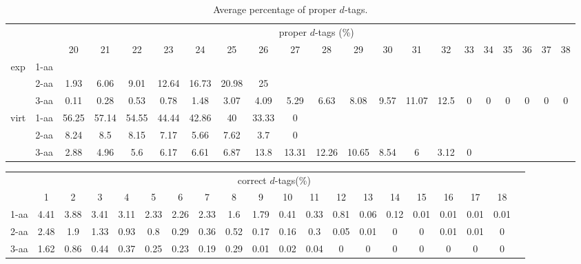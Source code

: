 \begin{table}[h]\tiny
\vspace{3mm}
{\centering
\begin{center}
\begin{tabular}{|c|l|c|c|c|c|c|c|c|c|c|c|c|c|c|c|c|c|c|c|c|}
  \hline
  \multicolumn{2}{|c|}{ } & \multicolumn{ 19 }{|c|}{ proper $d$-tags (\%)} \\
  \cline{3- 21}
  \multicolumn{2}{|c|}{ }  & 20 & 21 & 22 & 23 & 24 & 25 & 26 & 27 & 28 & 29 & 30 & 31 & 32 & 33 & 34 & 35 & 36 & 37 & 38\\
  \hline
  \multirow{3}{*}{exp}
&  1-aa  &  &  &  &  &  &  &  &  &  &  &  &  &  &  &  &  &  &  & \\
&  2-aa  & 1.93 & 6.06 & 9.01 & 12.64 & 16.73 & 20.98 & 25 &  &  &  &  &  &  &  &  &  &  &  & \\
&  3-aa  & 0.11 & 0.28 & 0.53 & 0.78 & 1.48 & 3.07 & 4.09 & 5.29 & 6.63 & 8.08 & 9.57 & 11.07 & 12.5 & 0 & 0 & 0 & 0 & 0 & 0\\
 \hline
  \multirow{3}{*}{virt} 
&  1-aa  & 56.25 & 57.14 & 54.55 & 44.44 & 42.86 & 40 & 33.33 & 0 &  &  &  &  &  &  &  &  &  &  & \\
&  2-aa  & 8.24 & 8.5 & 8.15 & 7.17 & 5.66 & 7.62 & 3.7 & 0 &  &  &  &  &  &  &  &  &  &  & \\
&  3-aa  & 2.88 & 4.96 & 5.6 & 6.17 & 6.61 & 6.87 & 13.8 & 13.31 & 12.26 & 10.65 & 8.54 & 6 & 3.12 & 0 &  &  &  &  & \\
 \hline
\end{tabular}
\end{center}
\par}
\centering

\caption{ Average percentage of proper $d$-tags.}

\vspace{3mm}
\label{table:proper-d-tags}
\end{table}
\begin{table}[h]\tiny
\vspace{3mm}
{\centering
\begin{center}
\begin{tabular}{|l|c|c|c|c|c|c|c|c|c|c|c|c|c|c|c|c|c|c|c|}
  \hline
  & \multicolumn{ 18 }{|c|}{correct $d$-tags(\%)} \\
  \cline{2- 19}
    & 1 & 2 & 3 & 4 & 5 & 6 & 7 & 8 & 9 & 10 & 11 & 12 & 13 & 14 & 15 & 16 & 17 & 18\\
  \hline
1-aa  & 4.41 & 3.88 & 3.41 & 3.11 & 2.33 & 2.26 & 2.33 & 1.6 & 1.79 & 0.41 & 0.33 & 0.81 & 0.06 & 0.12 & 0.01 & 0.01 & 0.01 & 0.01\\
2-aa  & 2.48 & 1.9 & 1.33 & 0.93 & 0.8 & 0.29 & 0.36 & 0.52 & 0.17 & 0.16 & 0.3 & 0.05 & 0.01 & 0 & 0 & 0.01 & 0.01 & 0\\
3-aa  & 1.62 & 0.86 & 0.44 & 0.37 & 0.25 & 0.23 & 0.19 & 0.29 & 0.01 & 0.02 & 0.04 & 0 & 0 & 0 & 0 & 0 & 0 & 0\\
 \hline
\end{tabular}
\end{center}
\par}
\centering

\vspace{3mm}
\label{table:correct-d-tags}
\end{table}
